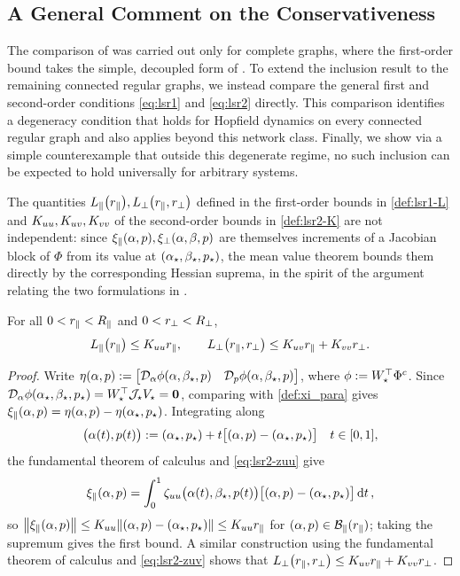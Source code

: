 \documentclass[a4paper]{cas-dc}
\begin{document}
\subsection{A General Comment on the Conservativeness}
\label{ssec:general}

The comparison of  was carried out only for complete graphs, where the first-order bound takes the simple, decoupled form of . To extend the inclusion result to the remaining connected regular graphs, we instead compare the general first and second-order conditions \eqref{eq:lsr1} and \eqref{eq:lsr2} directly. This comparison identifies a degeneracy condition that holds for Hopfield dynamics on every connected regular graph and also applies beyond this network class. Finally, we show via a simple counterexample that outside this degenerate regime, no such inclusion can be expected to hold universally for arbitrary systems.

The quantities \(\Lpr,\Lpp\) defined in the first-order bounds in \eqref{def:lsr1-L} and \(\Kuu,\Kuv,\Kvv\) of the second-order bounds in \eqref{def:lsr2-K} are not independent: since \(\xipr{p},\xipp{p}\) are themselves increments of a Jacobian block of \(\Phi\) from its value at \((\A_{\star},\B_{\star},p_{\star})\), the mean value theorem bounds them directly by the corresponding Hessian suprema, in the spirit of the argument relating the two \ImFT{} formulations in \cite{jindal2024estimates}.

\begin{theorem}
    \label{thm:LK}
    For all \(0<\rpr<\Rpr\) and \(0<\rpp<\Rpp\),
    \begin{equation}
        \Lpr \le \Kuu\rpr, \qquad \Lpp \le \Kuv\rpr + \Kvv\rpp. \label{eq:LK}
    \end{equation}
\end{theorem}
\begin{proof}
    Write \(\eta(\A,p):=\begin{bmatrix}\Da\phi(\A,\B_{\star},p) & \Dp\phi(\A,\B_{\star},p)\end{bmatrix}\), where \(\phi:=\W^{\top}\Phi^c\). Since \(\Da\phi(\A_{\star},\B_{\star},p_{\star})=\W^{\top}\J\V=\0\), comparing with \eqref{def:xi_para} gives \(\xipr{p}=\eta(\A,p)-\eta(\A_{\star},p_{\star})\). Integrating along
    \begin{equation*}
        \bigl(\A(t),p(t)\bigr) := (\A_{\star},p_{\star})+t\bigl[(\A,p)-(\A_{\star},p_{\star})\bigr] \quad t\in[0,1],
    \end{equation*}
    the fundamental theorem of calculus and \eqref{eq:lsr2-zuu} give
    \begin{equation*}
        \xipr{p}=\int_0^1 \zuu\bigl(\A(t),\B_{\star}, p(t)\bigr)\bigl[(\A,p)-(\A_{\star},p_{\star})\bigr]\dd{t},
    \end{equation*}
    so \(\norm{\xipr{p}} \le \Kuu \norm{(\A,p)-(\A_{\star},p_{\star})} \le \Kuu\rpr\) for \((\A,p)\in\Bpr[\rpr]\); taking the supremum gives the first bound. A similar construction using the fundamental theorem of calculus and \eqref{eq:lsr2-zuv} shows that \(\Lpp \le \Kuv\rpr + \Kvv\rpp\).
\end{proof}
\end{document}
